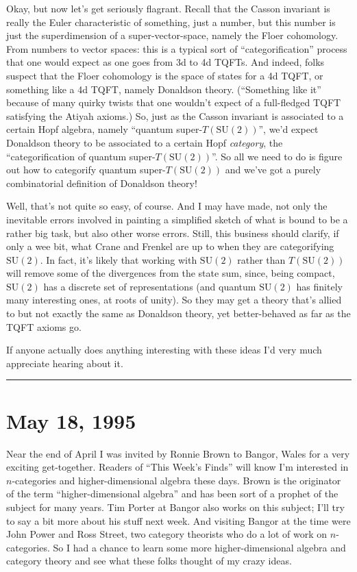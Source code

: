 \documentclass{article}
\begin{document}
Okay, but now let's get seriously flagrant. Recall that the Casson
invariant is really the Euler characteristic of something, just a
number, but this number is just the superdimension of a
super-vector-space, namely the Floer cohomology. From numbers to vector
spaces: this is a typical sort of ``categorification'' process that one
would expect as one goes from 3d to 4d TQFTs. And indeed, folks suspect
that the Floer cohomology is the space of states for a 4d TQFT, or
something like a 4d TQFT, namely Donaldson theory. (``Something like
it'' because of many quirky twists that one wouldn't expect of a
full-fledged TQFT satisfying the Atiyah axioms.) So, just as the Casson
invariant is associated to a certain Hopf algebra, namely ``quantum
super-\(T(\mathrm{SU}(2))\)'', we'd expect Donaldson theory to be
associated to a certain Hopf \emph{category}, the ``categorification of
quantum super-\(T(\mathrm{SU}(2))\)''. So all we need to do is figure
out how to categorify quantum super-\(T(\mathrm{SU}(2))\) and we've got
a purely combinatorial definition of Donaldson theory!

Well, that's not quite so easy, of course. And I may have made, not only
the inevitable errors involved in painting a simplified sketch of what
is bound to be a rather big task, but also other worse errors. Still,
this business should clarify, if only a wee bit, what Crane and Frenkel
are up to when they are categorifying \(\mathrm{SU}(2)\). In fact, it's
likely that working with \(\mathrm{SU}(2)\) rather than
\(T(\mathrm{SU}(2))\) will remove some of the divergences from the state
sum, since, being compact, \(\mathrm{SU}(2)\) has a discrete set of
representations (and quantum \(\mathrm{SU}(2)\) has finitely many
interesting ones, at roots of unity). So they may get a theory that's
allied to but not exactly the same as Donaldson theory, yet
better-behaved as far as the TQFT axioms go.

If anyone actually does anything interesting with these ideas I'd very
much appreciate hearing about it.

\begin{center}\rule{0.5\linewidth}{0.5pt}\end{center}



\hypertarget{week53}{%
\section{May 18, 1995}\label{week53}}

Near the end of April I was invited by Ronnie Brown to Bangor, Wales for
a very exciting get-together. Readers of ``This Week's Finds'' will know
I'm interested in \(n\)-categories and higher-dimensional algebra these
days. Brown is the originator of the term ``higher-dimensional algebra''
and has been sort of a prophet of the subject for many years. Tim Porter
at Bangor also works on this subject; I'll try to say a bit more about
his stuff next week. And visiting Bangor at the time were John Power and
Ross Street, two category theorists who do a lot of work on
\(n\)-categories. So I had a chance to learn some more
higher-dimensional algebra and category theory and see what these folks
thought of my crazy ideas.
\end{document}
